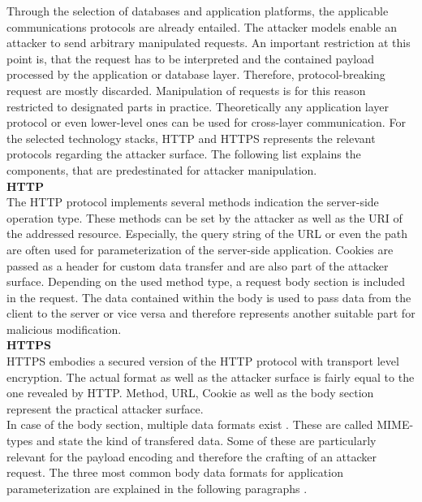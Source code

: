 Through the selection of databases and application platforms, the applicable communications protocols are already entailed. The attacker models enable an attacker to send arbitrary manipulated requests. An important restriction at this point is, that the request has to be interpreted and the contained payload processed by the application or database layer. Therefore, protocol-breaking request are mostly discarded. Manipulation of requests is for this reason restricted to designated parts in practice. Theoretically any application layer protocol or even lower-level ones can be used for cross-layer communication. For the selected technology stacks, HTTP and HTTPS represents the relevant protocols regarding the attacker surface. The following list explains the components, that are predestinated for attacker manipulation. \\

\textbf{HTTP}\\
The HTTP protocol implements several methods indication the server-side operation type. These methods can be set by the attacker as well as the URI of the addressed resource. Especially, the query string of the URL or even the path are often used for parameterization of the server-side application. Cookies are passed as a header for custom data transfer and are also part of the attacker surface. Depending on the used method type, a request body section is included in the request. The data contained within the body is used to pass data from the client to the server or vice versa and therefore represents another suitable part for malicious modification. \\

\textbf{HTTPS}\\
HTTPS embodies a secured version of the HTTP protocol with transport level encryption. The actual format as well as the attacker surface is fairly equal to the one revealed by HTTP. Method, URL, Cookie as well as the body section represent the practical attacker surface. \\

In case of the body section, multiple data formats exist \cite{Freed1996a}. These are called MIME-types and state the kind of transfered data. Some of these are particularly relevant for the payload encoding and therefore the crafting of an attacker request. The three most common body data formats for application parameterization are explained in the following paragraphs \cite{Freed2016}.\\

